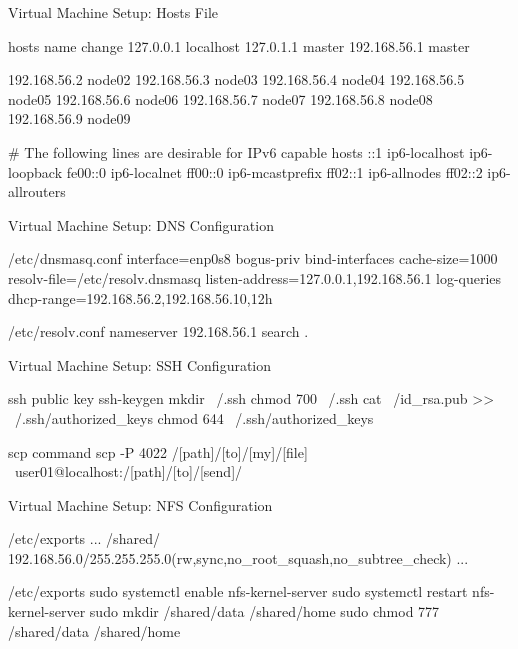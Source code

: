 \documentclass[10pt, english, xcolor={dvipsnames, table}]{beamer}
\begin{document}
\begin{frame}[fragile]{Virtual Machine Setup: Hosts File}
    \begin{codice}[style=bashstyle]{hosts name change}
        127.0.0.1 localhost
        127.0.1.1 master
        192.168.56.1 master

        192.168.56.2 node02
        192.168.56.3 node03
        192.168.56.4 node04
        192.168.56.5 node05
        192.168.56.6 node06
        192.168.56.7 node07
        192.168.56.8 node08
        192.168.56.9 node09

        # The following lines are desirable for IPv6 capable hosts
        ::1     ip6-localhost ip6-loopback
        fe00::0 ip6-localnet
        ff00::0 ip6-mcastprefix
        ff02::1 ip6-allnodes
        ff02::2 ip6-allrouters
    \end{codice}
\end{frame}

\begin{frame}[fragile]{Virtual Machine Setup: DNS Configuration}
    \begin{codice}[]{/etc/dnsmasq.conf}
        interface=enp0s8
        bogus-priv
        bind-interfaces
        cache-size=1000
        resolv-file=/etc/resolv.dnsmasq
        listen-address=127.0.0.1,192.168.56.1
        log-queries
        dhcp-range=192.168.56.2,192.168.56.10,12h
    \end{codice}

    \begin{codice}[]{/etc/resolv.conf}
        nameserver 192.168.56.1
        search .
    \end{codice}
\end{frame}

\begin{frame}[fragile]{Virtual Machine Setup: SSH Configuration}
    \begin{codice}[style=bashstyle]{ssh public key}
        ssh-keygen
        mkdir ~/.ssh
        chmod 700 ~/.ssh
        cat ~/id_rsa.pub >> ~/.ssh/authorized_keys
        chmod 644 ~/.ssh/authorized_keys
    \end{codice}
    \begin{codice}[style=bashstyle]{scp command}
        scp -P 4022 /[path]/[to]/[my]/[file] \
        user01@localhost:/[path]/[to]/[send]/
    \end{codice}
\end{frame}

\begin{frame}[fragile]{Virtual Machine Setup: NFS Configuration}
    \begin{codice}[style=bashstyle]{/etc/exports}
        ...
        /shared/  192.168.56.0/255.255.255.0(rw,sync,no_root_squash,no_subtree_check)
        ...
    \end{codice}
    \begin{codice}[style=bashstyle]{/etc/exports}
        sudo systemctl enable nfs-kernel-server
        sudo systemctl restart nfs-kernel-server
        sudo mkdir /shared/data /shared/home
        sudo chmod 777  /shared/data /shared/home
    \end{codice}
\end{frame}
\end{document}

